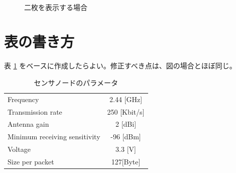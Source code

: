 \documentclass[main]{subfiles}
\begin{document}
\begin{figure}[tb]
    \begin{minipage}[b]{\linewidth}
        \centering
    \end{minipage}\\
    \begin{minipage}[b]{\linewidth}
        \centering
    \end{minipage}
    \caption{二枚を表示する場合}
    \label{fig:two-fig}
\end{figure}


\section{表の書き方}

表 \ref{tab:example} をベースに作成したらよい。修正すべき点は、図の場合とほぼ同じ。

\begin{table}[tb]
    \caption{センサノードのパラメータ}
    \label{tab:example}
    \centering
    \begin{tabular}{lc}
        \hline
        Frequency                     & 2.44 [GHz]   \\
        Transmission rate             & 250 [Kbit/s] \\
        Antenna gain                  & 2 [dBi]      \\
        Minimum receiving sensitivity & -96 [dBm]    \\
        Voltage                       & 3.3 [V]      \\
        Size per packet               & 127[Byte]    \\
        \hline
    \end{tabular}
\end{table}
\end{document}
